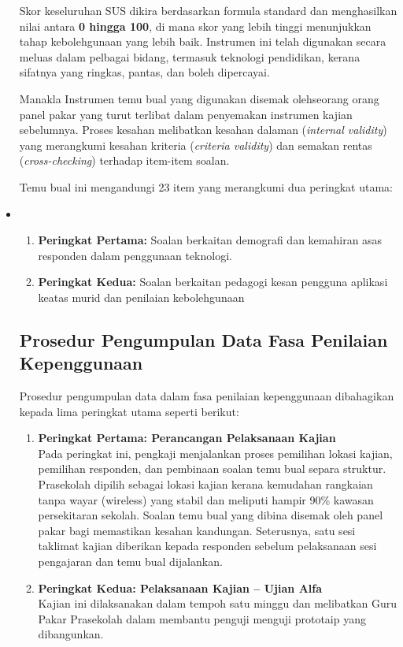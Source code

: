 \begin{itemize}
Skor keseluruhan SUS dikira berdasarkan formula standard dan menghasilkan nilai antara \textbf{0 hingga 100}, di mana skor yang lebih tinggi menunjukkan tahap kebolehgunaan yang lebih baik. Instrumen ini telah digunakan secara meluas dalam pelbagai bidang, termasuk teknologi pendidikan, kerana sifatnya yang ringkas, pantas, dan boleh dipercayai.


Manakla Instrumen temu bual  yang digunakan  disemak olehseorang orang panel pakar yang turut terlibat dalam penyemakan instrumen kajian sebelumnya. Proses kesahan melibatkan kesahan dalaman (\textit{internal validity}) yang merangkumi kesahan kriteria (\textit{criteria validity}) dan semakan rentas (\textit{cross-checking}) terhadap item-item soalan.

Temu bual ini mengandungi 23 item yang merangkumi dua peringkat utama:
\item 
\begin{enumerate}
  \item \textbf{Peringkat Pertama:} Soalan berkaitan demografi dan kemahiran asas responden dalam penggunaan teknologi.
  \item \textbf{Peringkat Kedua:} Soalan berkaitan pedagogi kesan pengguna aplikasi keatas murid  dan  penilaian kebolehgunaan
\end{enumerate}
\subsection{Prosedur Pengumpulan Data Fasa Penilaian Kepenggunaan}

Prosedur pengumpulan data dalam fasa penilaian kepenggunaan dibahagikan kepada lima peringkat utama seperti berikut:

\begin{enumerate}
  \item \textbf{Peringkat Pertama: Perancangan Pelaksanaan Kajian} \\
  Pada peringkat ini, pengkaji menjalankan proses pemilihan lokasi kajian, pemilihan responden, dan pembinaan soalan temu bual separa struktur. Prasekolah dipilih sebagai lokasi kajian kerana kemudahan rangkaian tanpa wayar (wireless) yang stabil dan meliputi hampir 90\% kawasan persekitaran sekolah. Soalan temu bual yang dibina disemak oleh panel pakar bagi memastikan kesahan kandungan. Seterusnya, satu sesi taklimat kajian diberikan kepada responden sebelum pelaksanaan sesi pengajaran dan temu bual dijalankan.

  \item \textbf{Peringkat Kedua: Pelaksanaan Kajian – Ujian Alfa} \\
  Kajian ini dilaksanakan dalam tempoh satu minggu dan melibatkan Guru Pakar Prasekolah dalam membantu penguji menguji prototaip yang dibangunkan.


\end{enumerate}
\end{itemize}
